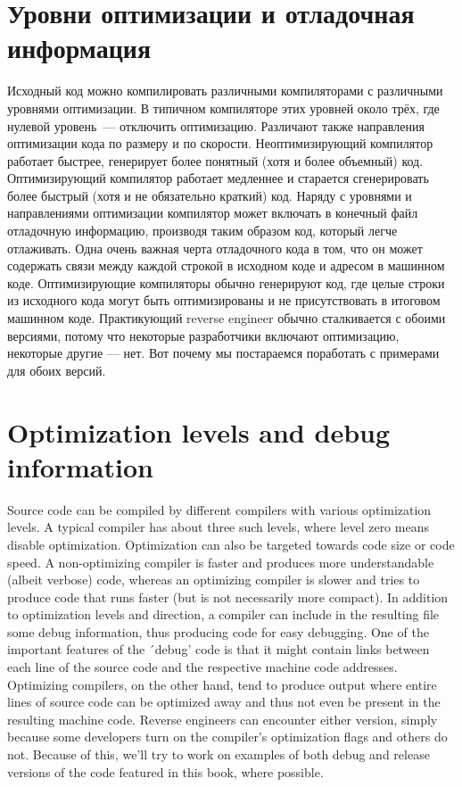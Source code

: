 \fi %

\ifdefined\RUSSIAN
\section*{Уровни оптимизации и отладочная информация}

Исходный код можно компилировать различными компиляторами с различными уровнями оптимизации.
В типичном компиляторе этих уровней около трёх, где нулевой уровень~--- отключить оптимизацию.
Различают также направления оптимизации кода по размеру и по скорости.
Неоптимизирующий компилятор работает быстрее, генерирует более понятный (хотя и более объемный) код.
Оптимизирующий компилятор работает медленнее и старается сгенерировать более быстрый (хотя и не обязательно краткий) код.
Наряду с уровнями и направлениями оптимизации компилятор может включать в конечный файл отладочную информацию,
производя таким образом код, который легче отлаживать.
Одна очень важная черта отладочного кода в том, что он может содержать
связи между каждой строкой в исходном коде и адресом в машинном коде.
Оптимизирующие компиляторы обычно генерируют код, где целые строки из исходного кода
могут быть оптимизированы и не присутствовать в итоговом машинном коде.
Практикующий reverse engineer обычно сталкивается с обоими версиями, потому что некоторые разработчики
включают оптимизацию, некоторые другие --- нет. Вот почему мы постараемся поработать с примерами для обоих версий.
\fi %

\ifdefined\ENGLISH
\section*{Optimization levels and debug information}

Source code can be compiled by different compilers with various optimization levels.
A typical compiler has about three such levels, where level zero means disable optimization.
Optimization can also be targeted towards code size or code speed.
A non-optimizing compiler is faster and produces more understandable (albeit verbose) code,
whereas an optimizing compiler is slower and tries to produce code that runs faster (but is not necessarily more compact).
In addition to optimization levels and direction, a compiler can include in the resulting file some debug information,
thus producing code for easy debugging.
One of the important features of the ´debug' code is that it might contain links
between each line of the source code and the respective machine code addresses.
Optimizing compilers, on the other hand, tend to produce output where entire lines of source code
can be optimized away and thus not even be present in the resulting machine code.
Reverse engineers can encounter either version, simply because some developers turn on the compiler's optimization flags and others do not. 
Because of this, we'll try to work on examples of both debug and release versions of the code featured in this book, where possible.
\fi %

